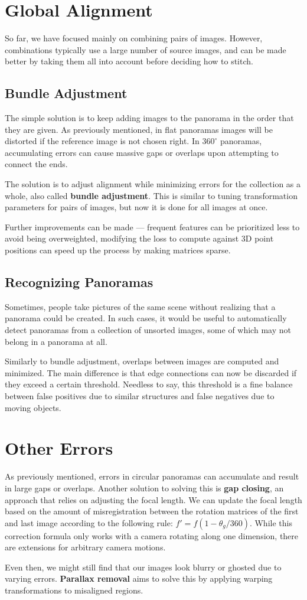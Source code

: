 \documentclass{article}
\begin{document}
\section{Global Alignment}
So far, we have focused mainly on combining pairs of images.
However, combinations typically use a large number of source images, and can be made better by taking them all into account before deciding how to stitch.

\subsection{Bundle Adjustment}
The simple solution is to keep adding images to the panorama in the order that they are given. As previously mentioned, in flat panoramas images will be distorted if the reference image is not chosen right.
In $360^\circ$ panoramas, accumulating errors can cause massive gaps or overlaps upon attempting to connect the ends.

The solution is to adjust alignment while minimizing errors for the collection as a whole, also called \textbf{bundle adjustment}.
This is similar to tuning transformation parameters for pairs of images, but now it is done for all images at once.

Further improvements can be made — frequent features can be prioritized less to avoid being overweighted, modifying the loss to compute against 3D point positions can speed up the process by making matrices sparse.

\subsection{Recognizing Panoramas}
Sometimes, people take pictures of the same scene without realizing that a panorama could be created.
In such cases, it would be useful to automatically detect panoramas from a collection of unsorted images, some of which may not belong in a panorama at all.

Similarly to bundle adjustment, overlaps between images are computed and minimized. The main difference is that edge connections can now be discarded if they exceed a certain threshold.
Needless to say, this threshold is a fine balance between false positives due to similar structures and false negatives due to moving objects.

\section{Other Errors}
As previously mentioned, errors in circular panoramas can accumulate and result in large gaps or overlaps.
Another solution to solving this is \textbf{gap closing}, an approach that relies on adjusting the focal length.
We can update the focal length based on the amount of misregistration between the rotation matrices of the first and last image according to the following rule: $f' = f\left(1-\theta_g/360\right)$.
While this correction formula only works with a camera rotating along one dimension, there are extensions for arbitrary camera motions.

Even then, we might still find that our images look blurry or ghosted due to varying errors. \textbf{Parallax removal} aims to solve this by applying warping transformations to misaligned regions.
\end{document}

